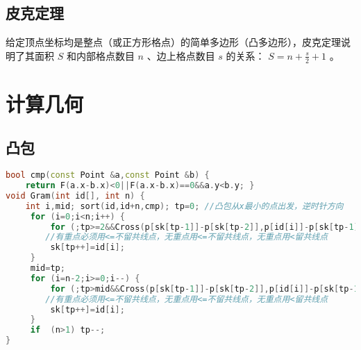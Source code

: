\documentclass[landscape,a4paper]{article}
\begin{document}
\subsection{皮克定理}

给定顶点坐标均是整点（或正方形格点）的简单多边形（凸多边形），皮克定理说明了其面积 $S$ 和内部格点数目 $n$ 、边上格点数目 $s$ 的关系： $S = n + \frac{s}{2} + 1$ 。


\section{计算几何}

\subsection{凸包}
\begin{lstlisting}[language=C++]
bool cmp(const Point &a,const Point &b) {
	return F(a.x-b.x)<0||F(a.x-b.x)==0&&a.y<b.y; }
void Gram(int id[], int n) {
	int i,mid; sort(id,id+n,cmp); tp=0; //凸包从x最小的点出发，逆时针方向
     for (i=0;i<n;i++) {
         for (;tp>=2&&Cross(p[sk[tp-1]]-p[sk[tp-2]],p[id[i]]-p[sk[tp-1]])<=0;tp--); 
		//有重点必须用<=不留共线点，无重点用<=不留共线点，无重点用<留共线点
         sk[tp++]=id[i];
     }
     mid=tp;
     for (i=n-2;i>=0;i--) {
         for (;tp>mid&&Cross(p[sk[tp-1]]-p[sk[tp-2]],p[id[i]]-p[sk[tp-1]])<=0;tp--); 
		//有重点必须用<=不留共线点，无重点用<=不留共线点，无重点用<留共线点
         sk[tp++]=id[i];
     }
     if  (n>1) tp--;
}
\end{lstlisting}
\end{document}
